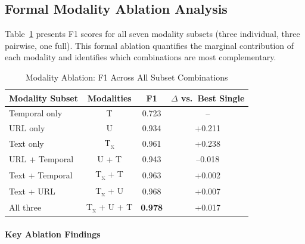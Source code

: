 \documentclass[conference]{IEEEtran}
\begin{document}
\subsection{Formal Modality Ablation Analysis}
\label{subsec:ablation}

Table~\ref{tab:ablation} presents F1 scores for all seven modality subsets
(three individual, three pairwise, one full). This formal ablation quantifies
the marginal contribution of each modality and identifies which combinations
are most complementary.

\begin{table}[t]
\centering
\caption{Modality Ablation: F1 Across All Subset Combinations}
\label{tab:ablation}
\begin{tabular}{lccc}
\toprule
\textbf{Modality Subset} & \textbf{Modalities} & \textbf{F1} & \textbf{$\Delta$ vs.\ Best Single} \\
\midrule
Temporal only    & T            & 0.723 & --      \\
URL only         & U            & 0.934 & +0.211  \\
Text only        & T\textsubscript{x} & 0.961 & +0.238  \\
\midrule
URL + Temporal   & U + T        & 0.943 & --0.018 \\
Text + Temporal  & T\textsubscript{x} + T & 0.963 & +0.002  \\
Text + URL       & T\textsubscript{x} + U & 0.968 & +0.007  \\
\midrule
All three        & T\textsubscript{x} + U + T & \textbf{0.978} & +0.017 \\
\bottomrule
\end{tabular}
\end{table}

\paragraph{Key Ablation Findings}
\end{document}
